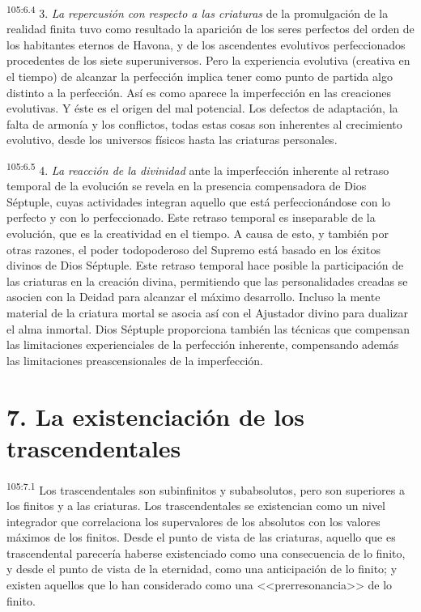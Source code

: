 \par
\textsuperscript{105:6.4} 3. \textit{La repercusión con respecto a las criaturas} de la promulgación de la realidad finita tuvo como resultado la aparición de los seres perfectos del orden de los habitantes eternos de Havona, y de los ascendentes evolutivos perfeccionados procedentes de los siete superuniversos. Pero la experiencia evolutiva (creativa en el tiempo) de alcanzar la perfección implica tener como punto de partida algo distinto a la perfección. Así es como aparece la imperfección en las creaciones evolutivas. Y éste es el origen del mal potencial. Los defectos de adaptación, la falta de armonía y los conflictos, todas estas cosas son inherentes al crecimiento evolutivo, desde los universos físicos hasta las criaturas personales.

\par
\textsuperscript{105:6.5} 4. \textit{La reacción de la divinidad} ante la imperfección inherente al retraso temporal de la evolución se revela en la presencia compensadora de Dios Séptuple, cuyas actividades integran aquello que está perfeccionándose con lo perfecto y con lo perfeccionado. Este retraso temporal es inseparable de la evolución, que es la creatividad en el tiempo. A causa de esto, y también por otras razones, el poder todopoderoso del Supremo está basado en los éxitos divinos de Dios Séptuple. Este retraso temporal hace posible la participación de las criaturas en la creación divina, permitiendo que las personalidades creadas se asocien con la Deidad para alcanzar el máximo desarrollo. Incluso la mente material de la criatura mortal se asocia así con el Ajustador divino para dualizar el alma inmortal. Dios Séptuple proporciona también las técnicas que compensan las limitaciones experienciales de la perfección inherente, compensando además las limitaciones preascensionales de la imperfección.

\section*{7. La existenciación de los trascendentales}
\par
\textsuperscript{105:7.1} Los trascendentales son subinfinitos y subabsolutos, pero son superiores a los finitos y a las criaturas. Los trascendentales se existencian como un nivel integrador que correlaciona los supervalores de los absolutos con los valores máximos de los finitos. Desde el punto de vista de las criaturas, aquello que es trascendental parecería haberse existenciado como una consecuencia de lo finito, y desde el punto de vista de la eternidad, como una anticipación de lo finito; y existen aquellos que lo han considerado como una <<prerresonancia>> de lo finito.

